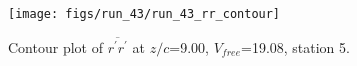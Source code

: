 \begin{figure}[H]
\centering
\texttt{[image: figs/run\_43/run\_43\_rr\_contour]}
\caption{Contour plot of $\overline{r^\prime r^\prime}$ at $z/c$=9.00, $V_{free}$=19.08, station 5.}
\label{fig:run_43_rr_contour}
\end{figure}


